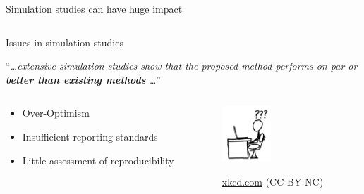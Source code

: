 \documentclass[english, 12pt, aspectratio=169]{beamer}
\begin{document}
\begin{frame}{Simulation studies can have huge impact}
\begin{block}{}
\begin{columns}
\begin{column}{0.5\textwidth}
      \end{column}
      \end{columns}
    \end{block}



\end{frame}




\begin{frame}{Issues in simulation studies}
    \begin{block}{}
      \begin{tcolorbox}[colframe=chineseBlue]
        ``\emph{\dots extensive simulation studies show that the proposed
          method performs on par or \textbf{\alert{better than existing
              methods}} \dots}''
      \end{tcolorbox}

    \end{block}
    
    \begin{block}{}
      \begin{columns}
      \begin{column}{0.5\textwidth}
      \pause
        \begin{itemize}
          \item Over-Optimism \citep[e.g.,][]{Ullmann2022}
          \pause
          \item Insufficient reporting standards \citep[e.g.,][]{Hoaglin1975}
          \pause
          \item Little assessment of reproducibility \citep[e.g.,][]{Luijken2023}
        \end{itemize}
      \end{column}
      \begin{column}{0.5\textwidth}
      \pause
        \centering
        \includegraphics[width=0.35\textwidth]{pics/questionXKCD.png}

        {\tiny \color{gray} \href{https://xkcd.com}{xkcd.com} (CC-BY-NC)}
      \end{column}
      \end{columns}
    \end{block}
  \end{frame}
\end{document}
